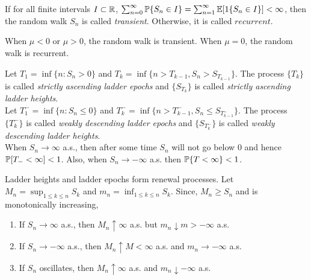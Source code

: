 \documentclass[all-lectures.tex]{subfiles}
\begin{document}
\begin{defn}
If for all finite intervals $I \subset \R$, $\sum_{n=0}^\infty \P\{S_n \in I\} = \sum_{n=1}^\infty \E[1\{S_n \in I\}] < \infty$, then the random walk $S_n$ is called \textit{transient}. Otherwise, it is called $recurrent$. 
\end{defn}
When $\mu < 0$ or $\mu > 0$, the random walk is transient. When $\mu =0$, the random walk is recurrent. \\
\begin{defn}
Let $T_1 = \inf\{n:S_n > 0\}$ and $T_k = \inf\{n>T_{k-1}, S_n>{S_{T_{k-1}}}\}$. The process $\{T_k\}$ is called \textit{strictly ascending ladder epochs} and $\{S_{T_k}\}$ is called \textit{strictly ascending ladder heights}. \\
\indent Let ${T}_{1}^- = \inf\{n:S_n \leq 0\}$ and ${T}_{k}^- = \inf\{n>{T}_{k-1}^-, S_n \leq {S_{{T}_{k-1}^-}}\}$. The process $\{{T}_{k}^-\}$ is called \textit{weakly descending ladder epochs} and $\{S_{{T}_{k}^-}\}$ is called \textit{weakly descending ladder heights}. \\
\indent When $S_n \to \infty$ a.s., then after some time $S_n$ will not go below $0$ and hence $\P[T_- < \infty] < 1$. Also, when $S_n \to -\infty$ a.s. then $\P\{T<\infty\} < 1$.
\end{defn}

Ladder heights and ladder epochs form renewal processes. Let $M_n = \sup_{1\leq k \leq n} S_k$ and $m_n = \inf_{1\leq k \leq n} S_k$. Since, $M_n \geq S_n$ and is monotonically increasing, 
\begin{enumerate}
\item If $S_n \to \infty$  a.s., then $M_n \uparrow \infty$ a.s. but $m_n \downarrow m > -\infty$ a.s.
\item If $S_n \to -\infty$ a.s., then $M_n \uparrow M < \infty$ a.s. and $m_n \to -\infty$ a.s.
\item If $S_n$ oscillates, then $M_n \uparrow \infty$ a.s. and $m_n \downarrow -\infty$ a.s.
\end{enumerate}
\end{document}
